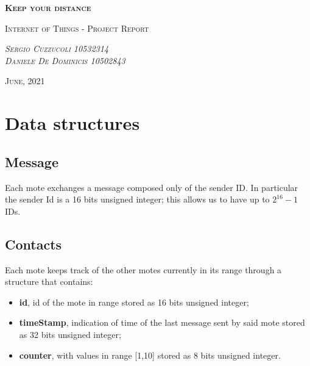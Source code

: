 \documentclass[12pt]{article}
\begin{document}
\begin{titlepage}
	\centering
	{\scshape\Huge\textbf{Keep your distance}\par}
	\vspace{1cm}
	{\scshape\Large Internet of Things - Project Report\par}
	\vspace{2cm}
	{\scshape\Large\emph{Sergio Cuzzucoli 10532314}\\ \emph{Daniele De Dominicis 10502843}\par}
	\vspace{4cm}
	{\scshape\normalsize{June, 2021}}
\end{titlepage}


\section{Data structures}

\subsection{Message}
Each mote exchanges a message composed only of the sender ID. In particular the sender Id is a 16 bits unsigned integer; this allows us to have up to \(2^{16}-1\) IDs.

\subsection{Contacts}
Each mote keeps track of the other motes currently in its range through a structure that contains:
\begin{itemize}
  \item \textbf{id}, id of the mote in range stored as 16 bits unsigned integer;
  \item \textbf{timeStamp}, indication of time of the last message sent by said mote stored as 32 bits unsigned integer;
  \item \textbf{counter}, with values in range [1,10] stored as 8 bits unsigned integer.
\end{itemize}
\end{document}
